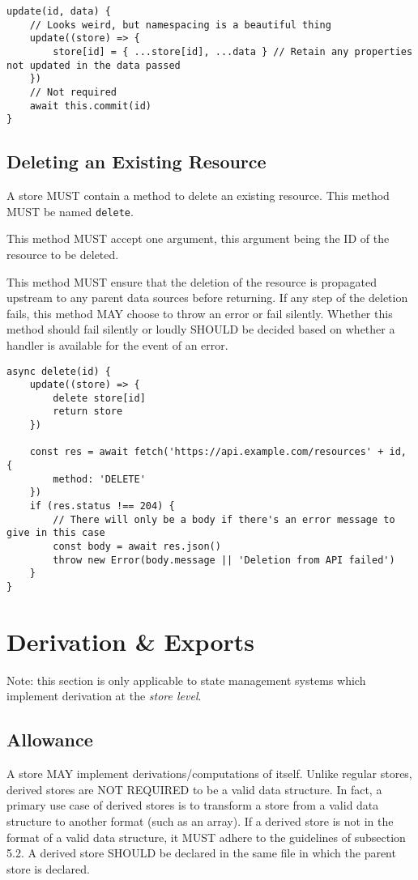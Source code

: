 \documentclass{article}
\begin{document}
\newpage
\begin{lstlisting}[caption=Update Method]
update(id, data) {
    // Looks weird, but namespacing is a beautiful thing
    update((store) => {
        store[id] = { ...store[id], ...data } // Retain any properties not updated in the data passed
    })
    // Not required
    await this.commit(id)
}
\end{lstlisting}

\subsection{Deleting an Existing Resource}
A store MUST contain a method to delete an existing resource. This method MUST be named \verb|delete|.

This method MUST accept one argument, this argument being the ID of the resource to be deleted.

This method MUST ensure that the deletion of the resource is propagated upstream to any parent data sources before returning. If any step of the deletion fails, this method MAY choose to throw an error or fail silently. Whether this method should fail silently or loudly SHOULD be decided based on whether a handler is available for the event of an error.

\begin{lstlisting}[caption=Delete Method]
async delete(id) {
    update((store) => {
        delete store[id]
        return store
    })
    
    const res = await fetch('https://api.example.com/resources' + id, {
        method: 'DELETE'
    })
    if (res.status !== 204) {
        // There will only be a body if there's an error message to give in this case
        const body = await res.json() 
        throw new Error(body.message || 'Deletion from API failed')
    }
}
\end{lstlisting}

\section{Derivation \& Exports}
Note: this section is only applicable to state management systems which implement derivation at the \emph{store level}.

\subsection{Allowance}
A store MAY implement derivations/computations of itself. Unlike regular stores, derived stores are NOT REQUIRED to be a valid data structure. In fact, a primary use case of derived stores is to transform a store from a valid data structure to another format (such as an array). If a derived store is not in the format of a valid data structure, it MUST adhere to the guidelines of subsection 5.2. A derived store SHOULD be declared in the same file in which the parent store is declared.
\end{document}
